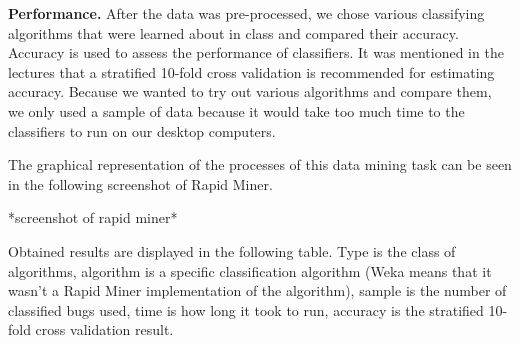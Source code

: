 {\bf Performance.} After the data was pre-processed, we chose various classifying algorithms that were learned about in class and compared their accuracy. Accuracy is used to assess the performance of classifiers. It was mentioned in the lectures that a stratified 10-fold cross validation is recommended for estimating accuracy. Because we wanted to try out various algorithms and compare them, we only used a sample of data because it would take too much time to the classifiers to run on our desktop computers.\newline

The graphical representation of the processes of this data mining task can be seen in the following screenshot of Rapid Miner.

*screenshot of rapid miner*

Obtained results are displayed in the following table. Type is the class of algorithms, algorithm is a specific classification algorithm (Weka means that it wasn't a Rapid Miner implementation of the algorithm), sample is the number of classified bugs used, time is how long it took to run, accuracy is the stratified 10-fold cross validation result.

